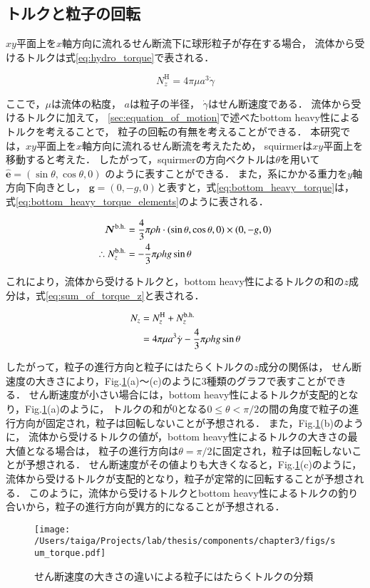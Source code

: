 \subsection{トルクと粒子の回転}
\label{sec:rotation}
$xy$平面上を$x$軸方向に流れるせん断流下に球形粒子が存在する場合，
流体から受けるトルクは式\eqref{eq:hydro_torque}で表される\cite{hidro_torque}．

    \begin{equation}
        N^\mathrm{H}_z = 4 \pi \mu a^3 \dot{\gamma}
        \label{eq:hydro_torque}
    \end{equation}

\noindent
ここで，$\mu$は流体の粘度，
$a$は粒子の半径，
$\dot{\gamma}$はせん断速度である．
流体から受けるトルクに加えて，
\ref{sec:equation_of_motion}で述べたbottom heavy性によるトルクを考えることで，
粒子の回転の有無を考えることができる．
本研究では，$xy$平面上を$x$軸方向に流れるせん断流を考えたため，
squirmerは$xy$平面上を移動すると考えた．
したがって，squirmerの方向ベクトルは$\theta$を用いて
$\boldsymbol{\hat{e}} = (\sin{\theta}, \cos{\theta}, 0)$
のように表すことができる．
また，系にかかる重力を$y$軸方向下向きとし，
$\boldsymbol{g} = (0, -g, 0)$と表すと，式\eqref{eq:bottom_heavy_torque}は，
式\eqref{eq:bottom_heavy_torque_elements}のように表される．

    \begin{align}
        \boldsymbol{N}^\mathrm{b.h.} &= \frac{4}{3} \pi \rho h \cdot (\sin{\theta}, \cos{\theta}, 0) \times (0, -g, 0) \notag \\
        \therefore N^\mathrm{b.h.}_z &= - \frac{4}{3} \pi \rho h g \sin{\theta}
        \label{eq:bottom_heavy_torque_elements}
    \end{align}

\noindent
これにより，流体から受けるトルクと，bottom heavy性によるトルクの和の$z$成分は，式\eqref{eq:sum_of_torque_z}と表される．

    \begin{align}
        N_z &= N^\mathrm{H}_z + N^\mathrm{b.h.}_z \notag \\
            &= 4 \pi \mu a^3 \dot{\gamma} - \frac{4}{3} \pi \rho h g \sin{\theta}
        \label{eq:sum_of_torque_z}
    \end{align}

\noindent
したがって，粒子の進行方向と粒子にはたらくトルクの$z$成分の関係は，
せん断速度の大きさにより，Fig.\ref{fig:sum_torque}(a)〜(c)のように3種類のグラフで表すことができる．
せん断速度が小さい場合には，bottom heavy性によるトルクが支配的となり，Fig.\ref{fig:sum_torque}(a)のように，
トルクの和が0となる$0 \leq \theta < \pi / 2$の間の角度で粒子の進行方向が固定され，粒子は回転しないことが予想される．
また，Fig.\ref{fig:sum_torque}(b)のように，
流体から受けるトルクの値が，bottom heavy性によるトルクの大きさの最大値となる場合は，
粒子の進行方向は$\theta = \pi / 2$に固定され，粒子は回転しないことが予想される．
せん断速度がその値よりも大きくなると，Fig.\ref{fig:sum_torque}(c)のように，
流体から受けるトルクが支配的となり，粒子が定常的に回転することが予想される．
このように，流体から受けるトルクとbottom heavy性によるトルクの釣り合いから，粒子の進行方向が異方的になることが予想される．

\begin{figure}[H]
    \centering
    \texttt{[image: /Users/taiga/Projects/lab/thesis/components/chapter3/figs/sum\_torque.pdf]}
    \caption{せん断速度の大きさの違いによる粒子にはたらくトルクの分類}
    \label{fig:sum_torque}
\end{figure}
